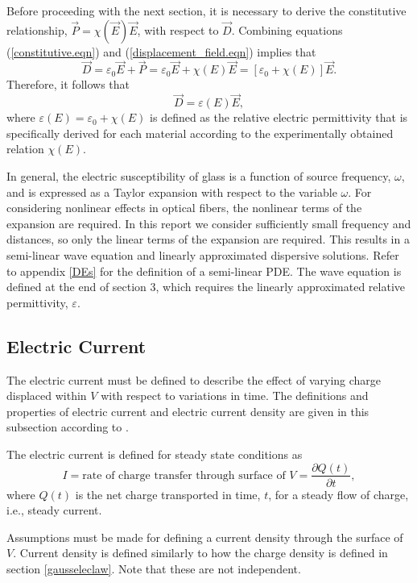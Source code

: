 \documentclass[12pt]{article}
\theoremstyle{definition}
\numberwithin{equation}{section}
\begin{document}
Before proceeding with the next section, it is necessary to derive the constitutive relationship, $\vec{P}=\chi(\vec{E})\vec{E}$, with respect to $\vec{D}$. Combining equations (\ref{constitutive.eqn}) and (\ref{displacement_field.eqn}) implies that
$$\vec{D}=\varepsilon_0\vec{E}+\vec{P}=\varepsilon_0\vec{E}+\chi(E)\vec{E}=\left[\varepsilon_0+\chi(E)\right]\vec{E}.$$
Therefore, it follows that
\begin{equation}
\vec{D}=\varepsilon(E)\vec{E},
\label{displacement_field.eqn}
\end{equation}
where $\varepsilon(E)=\varepsilon_0+\chi(E)$ is defined as the relative electric permittivity that is specifically derived for each material according to the experimentally obtained relation $\chi(E)$.

In general, the electric susceptibility of glass is a function of source frequency, $\omega$, and is expressed as a Taylor expansion with respect to the variable $\omega$. For considering nonlinear effects in optical fibers, the nonlinear terms of the expansion are required. In this report we consider sufficiently small frequency and distances, so only the linear terms of the expansion are required. This results in a semi-linear wave equation and linearly approximated dispersive solutions. Refer to appendix \ref{DEs} for the definition of a semi-linear PDE. The wave equation is defined at the end of section 3, which requires the linearly approximated relative permittivity, $\varepsilon$.
\subsection{Electric Current}\label{current.sec}
The electric current must be defined to describe the effect of varying charge displaced within $V$ with respect to variations in time. The definitions and properties of electric current and electric current density are given in this subsection according to \cite{Reitz}.

The electric current is defined for steady state conditions as
\begin{equation}
I=\mbox{rate of charge transfer through surface of }V=\frac{\partial Q(t)}{\partial t},
\label{orig_current.eqn}
\end{equation}
where $Q(t)$ is the net charge transported in time, $t$, for a steady flow of charge, i.e., steady current.

Assumptions must be made for defining a current density through the surface of $V$. Current density is defined similarly to how the charge density is defined in section \ref{gausseleclaw}. Note that these are not independent.
\end{document}
